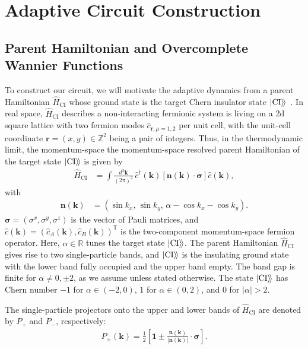 \documentclass[aps,prb,twocolumn,superscriptaddress,longbibliography,floatfix]{revtex4-2}
\newcommand{\mr}[1]{\mathrm{#1}}
\newcommand{\Id}{\mathbf{1}}
\newcommand{\bfr}{\boldsymbol r}
\newcommand{\kett}[1]{\ket{#1}\!\rangle}
\newcommand{\CI}{\kett{\mr{CI}}}
\theoremstyle{plain}
\theoremstyle{definition}
\theoremstyle{remark}
\begin{document}
\section{Adaptive Circuit Construction}
\subsection{Parent Hamiltonian and Overcomplete Wannier Functions}
To construct our circuit, we will motivate the adaptive dynamics from a parent Hamiltonian $\hat H_{\mr{CI}}$ whose ground state is the target Chern insulator state $\CI$~\cite{BhuiyanPanJian2026}. In real space, $\hat H_{\mr{CI}} $ describes a non-interacting fermionic system is living on a 2d square lattice with two fermion modes $\hat c_{\bfr,\mu=1,2}$ per unit cell, with the unit-cell coordinate $\bfr=(x,y)\in\mathbb{Z}^2$ being a pair of integers. Thus, in the thermodynamic limit, the momentum-space the momentum-space resolved parent Hamiltonian of the target state $\CI$ is given by
\begin{align}
    \hat H_{\mr{CI}} &= \int\frac{d^2\boldsymbol k}{(2\pi)^2}\,
    \hat c^\dagger(\boldsymbol k)
    [\boldsymbol n(\boldsymbol k)\cdot\boldsymbol\sigma]
    \hat c(\boldsymbol k),\label{eq:toymodel}
\end{align}
with 
\begin{align}
    \boldsymbol n(\boldsymbol k)
    &= (\sin k_x,\,\sin k_y,\,\alpha-\cos k_x-\cos k_y).
    \label{eq:spectral-vector-ci}
\end{align}
$\boldsymbol\sigma=(\sigma^x,\sigma^y,\sigma^z)$ is the vector of Pauli matrices, and $\hat c(\boldsymbol k)=(\hat c_A(\boldsymbol k),\hat c_B(\boldsymbol k))^{\mathsf T}$ is the two-component momentum-space fermion operator. Here, $\alpha\in\mathbb R$ tunes the target state $\CI$. The parent Hamiltonian $\hat H_{\mr{CI}}$ gives rise to two single-particle bands, and $\CI$ is the insulating ground state with the lower band fully occupied and the upper band empty. The band gap is finite for $\alpha\neq0,\pm2$, as we assume unless stated otherwise. The state $\CI$ has Chern number $-1$ for $\alpha\in(-2,0)$, $1$ for $\alpha\in(0,2)$, and $0$ for $|\alpha|>2$.

The single-particle projectors onto the upper and lower bands of $\hat H_{\mr{CI}}$ are denoted by $P_+$ and $P_-$, respectively:
\begin{align}
    P_{\pm}(\boldsymbol k)=\frac{1}{2}\left[
    \Id\pm\frac{\boldsymbol n(\boldsymbol k)}
    {|\boldsymbol n(\boldsymbol k)|}\cdot\boldsymbol\sigma\right].
    \label{eq:CI_ParentHamiltonian_Projectors}
\end{align}
\end{document}
